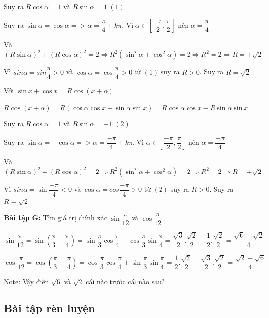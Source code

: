 \documentclass[12pt,a4paper]{article}
\begin{document}
 Suy ra $R \cos \alpha = 1$ và $R \sin \alpha = 1$ $(1)$

 Suy ra $\sin \alpha = \cos \alpha => \alpha = \dfrac{\pi}{4} + k\pi$. Vì $\alpha \in [\dfrac{-\pi}{2}, \dfrac{\pi}{2}]$ nên $\alpha = \dfrac{\pi}{4}$

 Và $(R\sin \alpha)^2 + (R\cos \alpha)^2 = 2 \Rightarrow R^2(\sin^2 \alpha + \cos^2 \alpha) = 2 \Rightarrow R^2 = 2 \Rightarrow R = \pm \sqrt{2}$

Vì $sin \alpha = sin \dfrac{\pi}{4} > 0$ và $\cos \alpha = \cos \dfrac{\pi}{4} > 0$ từ $(1)$ suy ra $R > 0$. Suy ra $R = \sqrt{2}$

 Với $\sin x + \cos x = R \cos (x + \alpha)$
 
 $R\cos(x + \alpha) = R(\cos \alpha \cos x - \sin\alpha \sin x) = R\cos \alpha \cos x - R\sin\alpha \sin x$

 Suy ra $R \cos \alpha = 1$ và $R \sin \alpha = -1$ $(2)$

 Suy ra $\sin \alpha = -\cos \alpha => \alpha = \dfrac{-\pi}{4} + k\pi$. Vì $\alpha \in [\dfrac{-\pi}{2}, \dfrac{\pi}{2}]$ nên $\alpha = \dfrac{-\pi}{4}$

 Và $(R\sin \alpha)^2 + (R\cos \alpha)^2 = 2 \Rightarrow R^2(\sin^2 \alpha + \cos^2 \alpha) = 2 \Rightarrow R^2 = 2 \Rightarrow R = \pm \sqrt{2}$

 Vì $sin \alpha = \sin \dfrac{-\pi}{4} < 0$ và $\cos \alpha = cos \dfrac{-\pi}{4} > 0$ từ $(2)$ suy ra $R > 0$. Suy ra $R = \sqrt{2}$

 \textbf{Bài tập G:} Tìm giá trị chính xác $\sin \dfrac{\pi}{12}$ và $\cos \dfrac{\pi}{12}$

$\sin \dfrac{\pi}{12} = \sin (\dfrac{\pi}{3} - \dfrac{\pi}{4}) = \sin \dfrac{\pi}{3} \cos \dfrac{\pi}{4} - \cos \dfrac{\pi}{3} \sin \dfrac{\pi}{4} = \dfrac{\sqrt{3}}{2}.\dfrac{\sqrt{2}}{2} - \dfrac{1}{2}.\dfrac{\sqrt{2}}{2} = \dfrac{\sqrt{6} - \sqrt{2}}{4}$

$\cos \dfrac{\pi}{12} = \cos (\dfrac{\pi}{3} - \dfrac{\pi}{4}) = \cos \dfrac{\pi}{3} \cos \dfrac{\pi}{4} + \sin \dfrac{\pi}{3} \sin \dfrac{\pi}{4} = \dfrac{1}{2}.\dfrac{\sqrt{2}}{2} + \dfrac{\sqrt{3}}{2}.\dfrac{\sqrt{2}}{2} = \dfrac{\sqrt{2} + \sqrt{6}}{4}$

Note: Vậy điền $\sqrt{6}$ và $\sqrt{2}$ cái nào trước cái nào sau?

\subsection{Bài tập rèn luyện}
\end{document}
